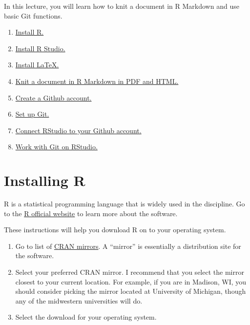 \documentclass[
]{book}
\providecommand{\tightlist}{%
  \setlength{\itemsep}{0pt}\setlength{\parskip}{0pt}}
\begin{document}
In this lecture, you will learn how to knit a document in R Markdown and use basic Git functions.

\begin{enumerate}
\def\labelenumi{\arabic{enumi}.}
\tightlist
\item
  \href{ps811-lecture-1-setup\#install-R}{Install R.}
\item
  \href{ps811-lecture-1-setup\#install-Rstudio}{Install R Studio.}
\item
  \href{ps811-lecture-1-setup\#install-latex}{Install LaTeX.}
\item
  \href{ps811-lecture-1-setup\#knit-RMarkdown}{Knit a document in R Markdown in PDF and HTML.}
\item
  \href{ps811-lecture-1-setup\#create-Github}{Create a Github account.}
\item
  \href{ps811-lecture-1-setup\#setup-Git}{Set up Git.}
\item
  \href{ps811-lecture-1-setup\#RStudio-Github}{Connect RStudio to your Github account.}
\item
  \href{ps811-lecture-1-setup\#work-git}{Work with Git on RStudio.}
\end{enumerate}

\hypertarget{install-R}{%
\section{Installing R}\label{install-R}}

R is a statistical programming language that is widely used in the discipline. Go to the \href{https://www.r-project.org/}{R official website} to learn more about the software.

These instructions will help you download R on to your operating system.

\begin{enumerate}
\def\labelenumi{\arabic{enumi}.}
\item
  Go to list of \href{https://cran.r-project.org/mirrors.html}{CRAN mirrors}. A ``mirror'' is essentially a distribution site for the software.
\item
  Select your preferred CRAN mirror. I recommend that you select the mirror closest to your current location. For example, if you are in Madison, WI, you should consider picking the mirror located at University of Michigan, though any of the midwestern universities will do.
\item
  Select the download for your operating system.
\end{enumerate}
\end{document}
